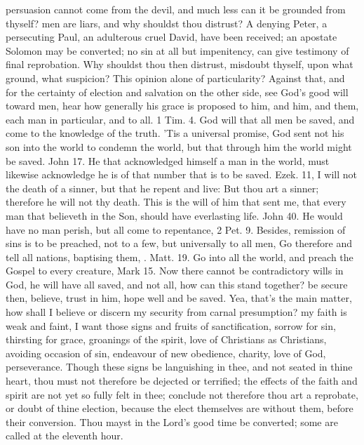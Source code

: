 {persuasion cannot come from the devil, and much less can it be grounded
from thyself? men are liars, and why shouldst thou distrust? A denying
Peter, a persecuting Paul, an adulterous cruel David, have been
received; an apostate Solomon may be converted; no sin at all but
impenitency, can give testimony of final reprobation. Why shouldst thou
then distrust, misdoubt thyself, upon what ground, what suspicion? This
opinion alone of particularity? Against that, and for the certainty of
election and salvation on the other side, see God's good will toward
men, hear how generally his grace is proposed to him, and him, and
them, each man in particular, and to all. 1 Tim.  4. God will that
all men be saved, and come to the knowledge of the truth. 'Tis a
universal promise, God sent not his son into the world to condemn the
world, but that through him the world might be saved. John  17. He
that acknowledged himself a man in the world, must likewise acknowledge
he is of that number that is to be saved. Ezek.  11, I will not
the death of a sinner, but that he repent and live: But thou art a
sinner; therefore he will not thy death. This is the will of him that
sent me, that every man that believeth in the Son, should have
everlasting life. John  40. He would have no man perish, but all
come to repentance, 2 Pet.  9. Besides, remission of sins is to be
preached, not to a few, but universally to all men, Go therefore and
tell all nations, baptising them, \etc{}. Matt.  19. Go into all the
world, and preach the Gospel to every creature, Mark  15. Now there
cannot be contradictory wills in God, he will have all saved, and not
all, how can this stand together? be secure then, believe, trust in
him, hope well and be saved. Yea, that's the main matter, how shall I
believe or discern my security from carnal presumption? my faith is
weak and faint, I want those signs and fruits of sanctification,
sorrow for sin, thirsting for grace, groanings of the spirit,
love of Christians as Christians, avoiding occasion of sin, endeavour
of new obedience, charity, love of God, perseverance. Though these
signs be languishing in thee, and not seated in thine heart, thou must
not therefore be dejected or terrified; the effects of the faith and
spirit are not yet so fully felt in thee; conclude not therefore thou
art a reprobate, or doubt of thine election, because the elect
themselves are without them, before their conversion. Thou mayst in the
Lord's good time be converted; some are called at the eleventh hour.

}

